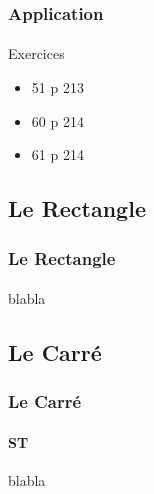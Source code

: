 \documentclass[xcolor={dvipsnames}]{beamer}
\begin{document}
\begin{frame}
	\frametitle{Application}  
	\framesubtitle{}
	
	\begin{block}{Exercices}
		\begin{itemize}
			\item 51 p 213
			\item 60 p 214
			\item 61 p 214
		\end{itemize}
	\end{block}
\end{frame}

\subsection{Le Rectangle}

\begin{frame}
\frametitle{Le Rectangle}  
\framesubtitle{}
blabla
\end{frame}

\subsection{Le Carré}

\begin{frame}
\frametitle{Le Carré}  
\framesubtitle{ST}
blabla
\end{frame}
\end{document}
